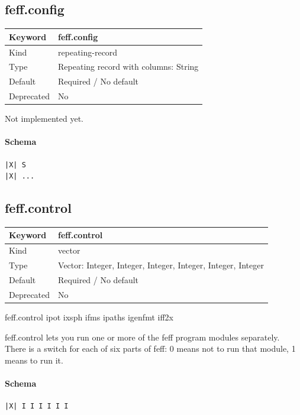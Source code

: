 \documentclass[11pt]{article}
\begin{document}
{{{\subsection{feff.config}
\label{kw:feff-config}
\begin{longtable}{|p{1.5in}|p{4.5in}|}
\hline
Keyword & feff.config \\
\hline
Kind & repeating-record \\
\hline
Type & Repeating record with columns: String \\
\hline
Default & Required / No default \\
\hline
Deprecated & No \\
\hline
\end{longtable}
 Not implemented yet.

\paragraph{Schema}
\begin{Verbatim}
|X| S
|X| ...
\end{Verbatim}

\subsection{feff.control}
\label{kw:feff-control}
\begin{longtable}{|p{1.5in}|p{4.5in}|}
\hline
Keyword & feff.control \\
\hline
Kind & vector \\
\hline
Type & Vector: Integer, Integer, Integer, Integer, Integer, Integer \\
\hline
Default & Required / No default \\
\hline
Deprecated & No \\
\hline
\end{longtable}

 feff.control{ ipot ixsph ifms ipaths igenfmt iff2x }

 feff.control lets you run one or more of the feff program modules
 separately. There is a switch for each of six parts of feff:
 0 means not to run that module, 1 means to run it.

\paragraph{Schema}
\begin{Verbatim}
|X| I I I I I I
\end{Verbatim}

}}}
\end{document}
